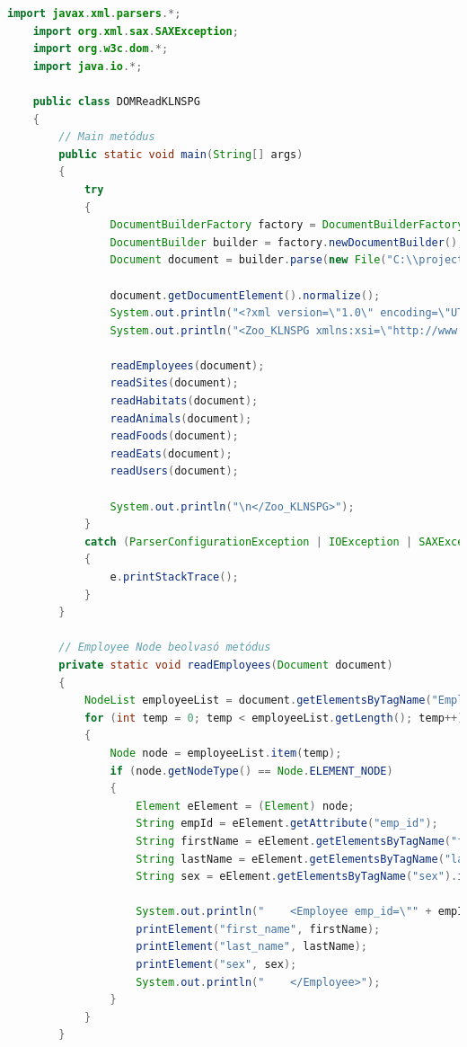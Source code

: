 \documentclass[12pt]{report}
\begin{document}
\begin{lstlisting}[caption={DOMReadKLNSPG.java} olvasó program, language=Java]
	import javax.xml.parsers.*;
	import org.xml.sax.SAXException;
	import org.w3c.dom.*;
	import java.io.*;
	
	public class DOMReadKLNSPG
	{
		// Main metódus
		public static void main(String[] args) 
		{
			try 
			{
				DocumentBuilderFactory factory = DocumentBuilderFactory.newInstance();
				DocumentBuilder builder = factory.newDocumentBuilder();
				Document document = builder.parse(new File("C:\\projects\\KLNSPG_XMLGyak\\XMLTaskKLNSPG\\XMLKLNSPG.xml"));
				
				document.getDocumentElement().normalize();
				System.out.println("<?xml version=\"1.0\" encoding=\"UTF-8\"?>\n");
				System.out.println("<Zoo_KLNSPG xmlns:xsi=\"http://www.w3.org/2001/XMLSchema-instance\" xsi:noNamespaceSchemaLocation=\"XMLSchemaKLNSPG.xsd\">\n");
				
				readEmployees(document);
				readSites(document);
				readHabitats(document);
				readAnimals(document);
				readFoods(document);
				readEats(document);
				readUsers(document);
				
				System.out.println("\n</Zoo_KLNSPG>");
			} 
			catch (ParserConfigurationException | IOException | SAXException e)
			{
				e.printStackTrace();
			}
		}
		
		// Employee Node beolvasó metódus
		private static void readEmployees(Document document) 
		{
			NodeList employeeList = document.getElementsByTagName("Employee");
			for (int temp = 0; temp < employeeList.getLength(); temp++) 
			{
				Node node = employeeList.item(temp);
				if (node.getNodeType() == Node.ELEMENT_NODE) 
				{
					Element eElement = (Element) node;
					String empId = eElement.getAttribute("emp_id");
					String firstName = eElement.getElementsByTagName("first_name").item(0).getTextContent();
					String lastName = eElement.getElementsByTagName("last_name").item(0).getTextContent();
					String sex = eElement.getElementsByTagName("sex").item(0).getTextContent();
					
					System.out.println("    <Employee emp_id=\"" + empId + "\">");
					printElement("first_name", firstName);
					printElement("last_name", lastName);
					printElement("sex", sex);
					System.out.println("    </Employee>");
				}
			}
		}
		

\end{lstlisting}
\end{document}
